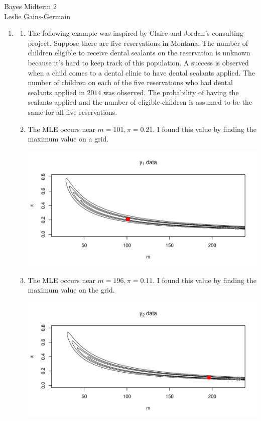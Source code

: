\documentclass[12pt]{article}\usepackage[]{graphicx}\usepackage[]{color}
\newenvironment{knitrout}{}{} %
\begin{document}
  
  
\begin{center}
\large{Bayes Midterm 2} \\
Leslie Gains-Germain
\end{center}

\begin{enumerate}

\item \begin{enumerate}

\item The following example was inspired by Claire and Jordan's consulting project. Suppose there are five reservations in Montana. The number of children eligible to receive dental sealants on the reservation is unknown because it's hard to keep track of this population. A success is observed when a child comes to a dental clinic to have dental sealants applied. The number of children on each of the five reservations who had dental sealants applied in $2014$ was observed. The probability of having the sealants applied and the number of eligible children is assumed to be the same for all five reservations. 

\item The MLE occurs near $m=101, \pi=0.21$. I found this value by finding the maximum value on a grid. 

\begin{knitrout}\footnotesize
{}\color{fgcolor}
\includegraphics[width=.9\linewidth]{figure/likelihood-1} 

\end{knitrout}

\item The MLE occurs near $m=196, \pi=0.11$. I found this value by finding the maximum value on the grid.  

\begin{knitrout}\footnotesize
{}\color{fgcolor}
\includegraphics[width=.9\linewidth]{figure/likelihood2-1} 


\end{knitrout}
\end{enumerate}
\end{enumerate}
\end{document}
